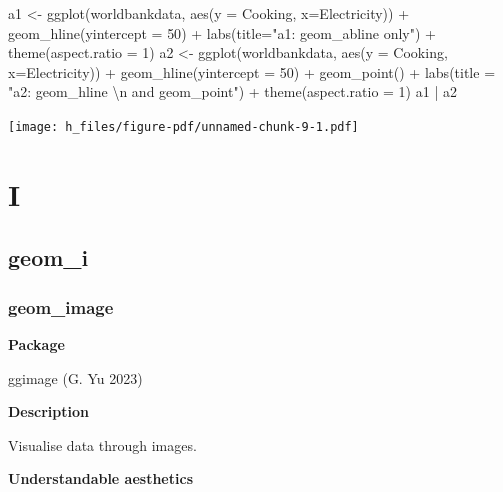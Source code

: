 \documentclass[
  letterpaper,
  DIV=11,
  numbers=noendperiod]{scrreprt}
\newenvironment{Shaded}{\begin{snugshade}}{\end{snugshade}}
\newcommand{\AttributeTok}[1]{\textcolor[rgb]{0.40,0.45,0.13}{#1}}
\newcommand{\DecValTok}[1]{\textcolor[rgb]{0.68,0.00,0.00}{#1}}
\newcommand{\FunctionTok}[1]{\textcolor[rgb]{0.28,0.35,0.67}{#1}}
\newcommand{\NormalTok}[1]{\textcolor[rgb]{0.00,0.23,0.31}{#1}}
\newcommand{\OtherTok}[1]{\textcolor[rgb]{0.00,0.23,0.31}{#1}}
\newcommand{\SpecialCharTok}[1]{\textcolor[rgb]{0.37,0.37,0.37}{#1}}
\newcommand{\StringTok}[1]{\textcolor[rgb]{0.13,0.47,0.30}{#1}}
\begin{document}
\begin{Shaded}
\begin{Highlighting}[]
\NormalTok{a1 }\OtherTok{\textless{}{-}} \FunctionTok{ggplot}\NormalTok{(worldbankdata, }\FunctionTok{aes}\NormalTok{(}\AttributeTok{y =}\NormalTok{ Cooking, }\AttributeTok{x=}\NormalTok{Electricity)) }\SpecialCharTok{+} 
  \FunctionTok{geom\_hline}\NormalTok{(}\AttributeTok{yintercept =} \DecValTok{50}\NormalTok{) }\SpecialCharTok{+} 
  \FunctionTok{labs}\NormalTok{(}\AttributeTok{title=}\StringTok{"a1: geom\_abline only"}\NormalTok{) }\SpecialCharTok{+}
  \FunctionTok{theme}\NormalTok{(}\AttributeTok{aspect.ratio =} \DecValTok{1}\NormalTok{)}
\NormalTok{a2 }\OtherTok{\textless{}{-}} \FunctionTok{ggplot}\NormalTok{(worldbankdata, }\FunctionTok{aes}\NormalTok{(}\AttributeTok{y =}\NormalTok{ Cooking, }\AttributeTok{x=}\NormalTok{Electricity)) }\SpecialCharTok{+} 
  \FunctionTok{geom\_hline}\NormalTok{(}\AttributeTok{yintercept =} \DecValTok{50}\NormalTok{) }\SpecialCharTok{+} 
  \FunctionTok{geom\_point}\NormalTok{() }\SpecialCharTok{+} 
  \FunctionTok{labs}\NormalTok{(}\AttributeTok{title =} \StringTok{"a2: geom\_hline }\SpecialCharTok{\textbackslash{}n}\StringTok{ and geom\_point"}\NormalTok{) }\SpecialCharTok{+}
  \FunctionTok{theme}\NormalTok{(}\AttributeTok{aspect.ratio =} \DecValTok{1}\NormalTok{)}
\NormalTok{a1 }\SpecialCharTok{|}\NormalTok{ a2}
\end{Highlighting}
\end{Shaded}

\texttt{[image: h\_files/figure-pdf/unnamed-chunk-9-1.pdf]}

\part{I}

\chapter{geom\_i}\label{sec-i}

\section{geom\_image}\label{image}

\textbf{Package}

ggimage (G. Yu 2023)

\textbf{Description}

Visualise data through images.

\textbf{Understandable aesthetics}
\end{document}

